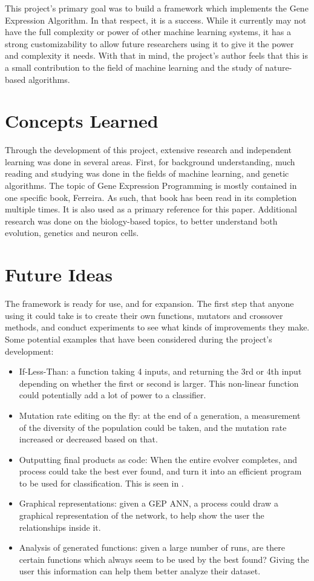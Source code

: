 \documentclass[a4paper,11pt]{report}
\begin{document}
This project's primary goal was to build a framework which implements the Gene Expression Algorithm. 
In that respect, it is a success. While it currently may not have the full complexity or power of 
other machine learning systems, it has a strong customizability to allow future researchers using it
to give it the power and complexity it needs. With that in mind, the project's author feels that 
this is a small contribution to the field of machine learning and the study of nature-based algorithms. 

\section{Concepts Learned}

Through the development of this project, extensive research and independent learning was done in 
several areas. First, for background understanding, much reading and studying was done in the 
fields of machine learning, and genetic algorithms. The topic of Gene Expression Programming 
is mostly contained in one specific book, 
Ferreira. %
As such, that book has been read in its completion multiple times. It is also used as a primary 
reference for this paper. Additional research was done on the biology-based topics, to better 
understand both evolution, genetics and neuron cells. 

\section{Future Ideas}

The framework is ready for use, and for expansion. The first step that anyone using it could take 
is to create their own functions, mutators and crossover methods, and conduct experiments to see 
what kinds of improvements they make. Some potential examples that have been considered during the 
project's development:
\begin{itemize}
 \item If-Less-Than: a function taking 4 inputs, and returning the 3rd or 4th input depending on whether 
the first or second is larger. This non-linear function could potentially add a lot of power to a classifier. 
 \item Mutation rate editing on the fly: at the end of a generation, a measurement of the diversity of 
the population could be taken, and the mutation rate increased or decreased based on that. 
 \item Outputting final products as code: When the entire evolver completes, and process could take the best
ever found, and turn it into an efficient program to be used for classification. This is seen in \cite{ferreira06}.
\item Graphical representations: given a GEP ANN, a process could draw a graphical representation of the 
network, to help show the user the relationships inside it. 
\item Analysis of generated functions: given a large number of runs, are there certain functions which 
always seem to be used by the best found? Giving the user this information can help them better analyze 
their dataset. 
\end{itemize}
\end{document}

